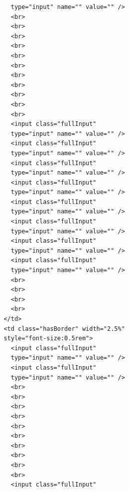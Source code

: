 \documentclass[12pt]{report} %
\begin{document}
\begin{verbatim}
                                    type="input" name="" value="" />
                                    <br>
                                    <br>
                                    <br>
                                    <br>
                                    <br>
                                    <br>
                                    <br>
                                    <br>
                                    <br>
                                    <br>
                                    <br>
                                    <input class="fullInput"
                                    type="input" name="" value="" />
                                    <input class="fullInput"
                                    type="input" name="" value="" />
                                    <input class="fullInput"
                                    type="input" name="" value="" />
                                    <input class="fullInput"
                                    type="input" name="" value="" />
                                    <input class="fullInput"
                                    type="input" name="" value="" />
                                    <input class="fullInput"
                                    type="input" name="" value="" />
                                    <input class="fullInput"
                                    type="input" name="" value="" />
                                    <input class="fullInput"
                                    type="input" name="" value="" />
                                    <br>
                                    <br>
                                    <br>
                                    <br>
                                  </td>
                                  <td class="hasBorder" width="2.5%"
                                  style="font-size:0.5rem">
                                    <input class="fullInput"
                                    type="input" name="" value="" />
                                    <input class="fullInput"
                                    type="input" name="" value="" />
                                    <br>
                                    <br>
                                    <br>
                                    <br>
                                    <br>
                                    <br>
                                    <br>
                                    <br>
                                    <br>
                                    <br>
                                    <input class="fullInput"

\end{verbatim}
\end{document}
